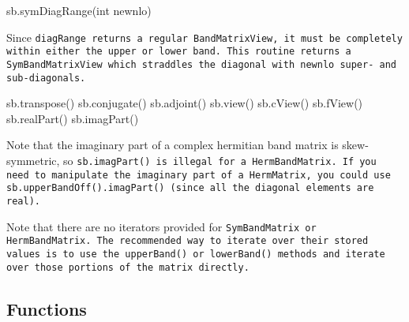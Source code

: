 \begin{tmvcode}
sb.symDiagRange(int newnlo)
\end{tmvcode}
Since \tt{diagRange} returns a regular \tt{BandMatrixView}, it must be completely
within either the upper or lower band.  This routine returns a \tt{SymBandMatrixView}
which straddles the diagonal with \tt{newnlo} super- and sub-diagonals.

\begin{tmvcode}
sb.transpose()
sb.conjugate()
sb.adjoint()
sb.view()
sb.cView()
sb.fView()
sb.realPart()
sb.imagPart()
\end{tmvcode}
Note that the imaginary part of a complex hermitian band matrix is
skew-symmetric, so \tt{sb.imagPart()} is illegal for a \tt{HermBandMatrix}.
If you need to manipulate the imaginary part of a \tt{HermMatrix}, 
you could use
\tt{sb.upperBandOff().imagPart()} 
(since all the diagonal elements are real).
\vspace{12pt}

Note that there are no iterators provided for \tt{SymBandMatrix} or \tt{HermBandMatrix}.  The recommended way to iterate over their stored values is to use the \tt{upperBand()} or \tt{lowerBand()} methods and iterate over those portions of the matrix directly.

\subsection{Functions}
\label{SymBandMatrix_Functions}


